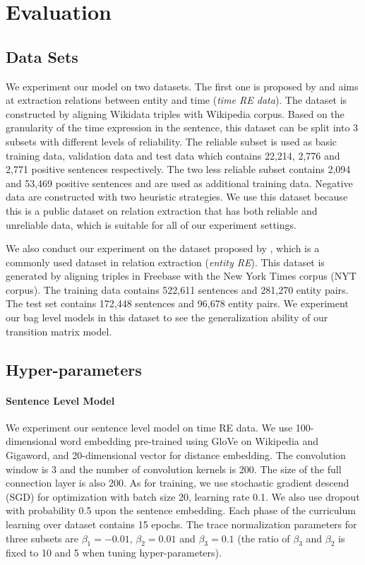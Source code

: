 \section{Evaluation}
\subsection{Data Sets}
We experiment our model on two datasets. The first one is proposed by \cite{luo2016temporal} and aims at extraction relations between entity and time (\emph{time RE data}). The dataset is constructed by aligning Wikidata triples with Wikipedia corpus. Based on the granularity of the time expression in the sentence, this dataset can be split into 3 subsets with different levels of reliability. The reliable subset is used as basic training data, validation data and test data which contains 22,214, 2,776 and 2,771 positive sentences respectively. The two less reliable subset contains 2,094 and 53,469 positive sentences and are used as additional training data. Negative data are constructed with two heuristic strategies. We use this dataset because this is a public dataset on relation extraction that has both reliable and unreliable data, which is suitable for all of our experiment settings.

We also conduct our experiment on the dataset proposed by \cite{riedel2010modeling}, which is a commonly used dataset in relation extraction (\emph{entity RE}). This dataset is generated by aligning triples in Freebase with the New York Times corpus (NYT corpus). The training data contains 522,611 sentences and 281,270 entity pairs. The test set contains 172,448 sentences and 96,678 entity pairs. We experiment our bag level models in this dataset to see the generalization ability of our transition matrix model.


\subsection{Hyper-parameters}
\paragraph{Sentence Level Model}
We experiment our sentence level model on time RE data. We use 100-dimensional word embedding pre-trained using GloVe \cite{pennington2014glove} on Wikipedia and Gigaword, and 20-dimensional vector for distance embedding. The convolution window is 3 and the number of convolution kernels is 200. The size of the full connection layer is also 200. As for training, we use stochastic gradient descend (SGD) for optimization with batch size 20, learning rate 0.1. We also use dropout with probability 0.5 upon the sentence embedding. Each phase of the curriculum learning over dataset contains 15 epochs. The trace normalization parameters for three subsets are $\beta_1=-0.01$, $\beta_2=0.01$ and $\beta_3=0.1$ (the ratio of $\beta_3$ and $\beta_2$ is fixed to 10 and 5 when tuning hyper-parameters).

